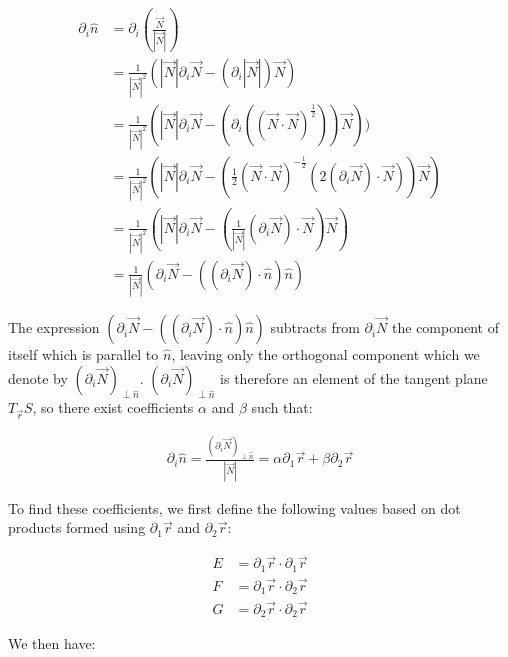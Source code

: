 \documentclass{article}
\begin{document}
\begin{align*}
  \partial_i \hat{n} &= \partial_i \left( \frac{\vec{N}}{|\vec{N}|} \right) \\
  &= \frac{1}{|\vec{N}|^2}(|\vec{N}| \partial_i \vec{N} - (\partial_i |\vec{N}|) \vec{N}) \\
&= \frac{1}{|\vec{N}|^2} (|\vec{N}| \partial_i \vec{N} - (\partial_i ((\vec{N} \cdot \vec{N})^{\frac{1}{2}}))\vec{N})) \\
&= \frac{1}{|\vec{N}|^2} \left(|\vec{N}| \partial_i \vec{N} - \left( \frac{1}{2} (\vec{N} \cdot \vec{N})^{-\frac{1}{2}} (2 (\partial_i \vec{N}) \cdot \vec{N}) \right) \vec{N} \right) \\
&= \frac{1}{|\vec{N}|^2} \left(|\vec{N}| \partial_i \vec{N} - \left( \frac{1}{|\vec{N}|} (\partial_i \vec{N}) \cdot \vec{N} \right) \vec{N} \right) \\
&= \frac{1}{|\vec{N}|} (\partial_i \vec{N} - ((\partial_i \vec{N}) \cdot \hat{n}) \hat{n})
\end{align*}

The expression $(\partial_i \vec{N} - ((\partial_i \vec{N}) \cdot \hat{n}) \hat{n})$ subtracts from $\partial_i \vec{N}$ the component of itself which is parallel to $\hat{n}$, leaving only the orthogonal component which we denote by $(\partial_i \vec{N})_{\perp \hat{n}}$. $(\partial_i \vec{N})_{\perp \hat{n}}$ is therefore an element of the tangent plane $T_{\vec{r}}S$, so there exist coefficients $\alpha$ and $\beta$ such that:

\begin{align*}
\partial_i \hat{n} = \frac{(\partial_i \vec{N})_{\perp \hat{n}}}{|\vec{N}|} = \alpha \partial_1 \vec{r} + \beta \partial_2 \vec{r}
\end{align*}

To find these coefficients, we first define the following values based on dot products formed using $\partial_1 {\vec{r}}$ and $\partial_2 {\vec{r}}$:

\begin{align}
E &= \partial_1{\vec{r}} \cdot \partial_1{\vec{r}} \\
F &= \partial_1{\vec{r}} \cdot \partial_2{\vec{r}} \\
G &= \partial_2{\vec{r}} \cdot \partial_2{\vec{r}}
\end{align}

We then have:
\end{document}
